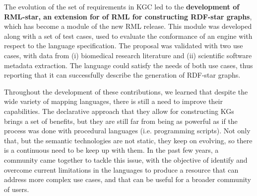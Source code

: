 The evolution of the set of requirements in KGC led to the \textbf{development of RML-star, an extension for of RML for constructing RDF-star graphs}, which has become a module of the new RML release. 
This module was developed along with a set of test cases, used to evaluate the conformance of an engine with respect to the language specification. 
The proposal was validated with two use cases, with data from (i) biomedical research literature and (ii) scientific software metadata extraction. 
The language could satisfy the needs of both use cases, thus reporting that it can successfully describe the generation of RDF-star graphs. 

Throughout the development of these contributions, we learned that despite the wide variety of mapping languages, there is still a need to improve their capabilities. The declarative approach that they allow for constructing KGs brings a set of benefits, but they are still far from being as powerful as if the process was done with procedural languages (i.e. programming scripts). Not only that, but the semantic technologies are not static, they keep on evolving, so there is a continuous need to be keep up with them. In the past few years, a community came together to tackle this issue, with the objective of identify and overcome current limitations in the languages to produce a resource that can address more complex use cases, and that can be useful for a broader community of users. 




